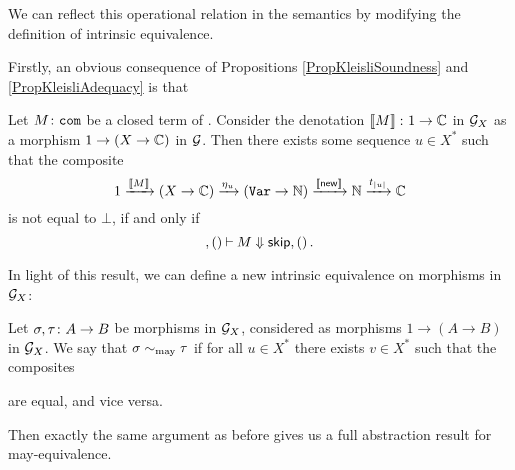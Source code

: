 \documentclass{article}
\begin{document}
We can reflect this operational relation in the semantics by modifying the definition of intrinsic equivalence.  

Firstly, an obvious consequence of Propositions \ref{PropKleisliSoundness} and \ref{PropKleisliAdequacy} is that

\begin{corollary}
  Let $M\colon{\mathtt{com}}$ be a closed term of \IAX.  
  Consider the denotation $\left\llbracket M\right\rrbracket\colon 1 \to \mathbb{C}$ in $\mathcal G_X$ as a morphism $1 \to (X \to \mathbb{C})$ in $\mathcal G$.  
  Then there exists some sequence $u\in X^*$ such that the composite
  \[
    1 \xrightarrow{\left\llbracket M\right\rrbracket}
    (X \to \mathbb{C}) \xrightarrow{\eta_u}
    ({\mathtt{Var}} \to \mathbb{N}) \xrightarrow{\left\llbracket\operatorname{{\mathsf{new}}}\right\rrbracket}
    \mathbb{N} \xrightarrow{t_{|u|}}
    \mathbb{C}
    \]
  is not equal to $\bot$, if and only if
  \[
    ,()\mathbin{\vdash} M \Downarrow {\mathsf{skip}},()\,.
    \]
  \label{CorMayAdequacy}
\end{corollary}

In light of this result, we can define a new intrinsic equivalence on morphisms in $\mathcal G_X$:

\begin{definition}
  Let $\sigma,\tau\colon A \to B$ be morphisms in $\mathcal G_X$, considered as morphisms $1 \to (A \to B)$ in $\mathcal G_X$.  
  We say that $\sigma \sim_{\operatorname{may}} \tau$ if for all $u\in X^*$ there exists $v\in X^*$ such that the composites
  are equal, and vice versa.
  \label{DefMayIntrinsicEquivalence}
\end{definition}

Then exactly the same argument as before gives us a full abstraction result for may-equivalence.
\end{document}
